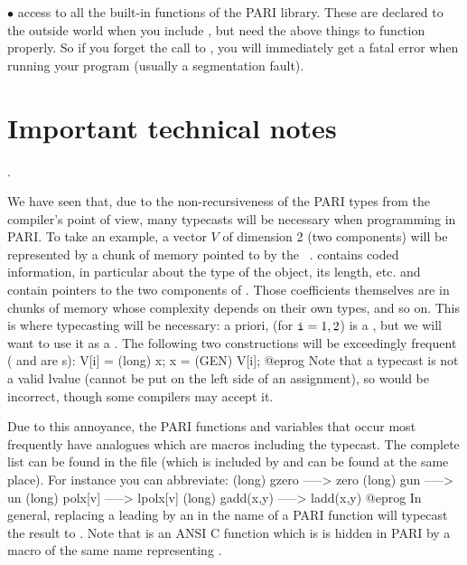 $\bullet$ access to all the built-in functions of the PARI library.
These are declared to the outside world when you include , but
need the above things to function properly. So if you forget the call to
, you will immediately get a fatal error when running your
program (usually a segmentation fault).

\section{Important technical notes}

.\label{se:typecast}

\noindent
We have seen that, due to the non-recursiveness of the PARI types from the
compiler's point of view, many typecasts will be necessary when programming
in PARI. To take an example, a vector $V$ of dimension 2 (two components)
will be represented by a chunk of memory pointed to by the ~.
 contains coded information, in particular about the type of the
object, its length, etc.  and  contain pointers to
the two components of . Those coefficients  themselves are in
chunks of memory whose complexity depends on their own types, and so on. This
is where typecasting will be necessary: a priori,  (for
${\tt i}=1,2$) is a , but we will want to use it as a .
The following two constructions will be exceedingly frequent ( and
 are s):
%
\bprog
  V[i] = (long) x;
  x = (GEN) V[i];
@eprog
\noindent Note that a typecast is not a valid lvalue (cannot be put on the
left side of an assignment), so  would be incorrect, though
some compilers may accept it.

Due to this annoyance, the PARI functions and variables that occur most
frequently have analogues which are macros including the typecast. The complete
list can be found in the file  (which is included by
 and can be found at the same place). For instance you can
abbreviate:
%
\bprog
(long) gzero     ----->  zero
(long) gun       ----->  un
(long) polx[v]   ----->  lpolx[v]
(long) gadd(x,y) ----->  ladd(x,y)
@eprog\noindent%
%
%
In general, replacing a leading  by an  in the name of a PARI
function will typecast the result to . Note that  is an
ANSI C function which is is hidden in PARI by a macro of the same name
representing .

